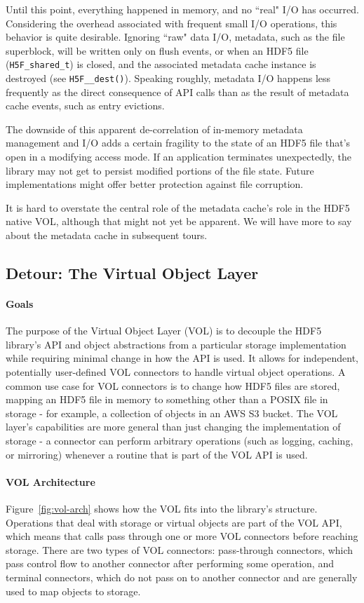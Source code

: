 Until this point, everything happened in memory, and no ``real" I/O has occurred. Considering the overhead associated with frequent small I/O operations, this behavior is quite desirable. Ignoring ``raw" data I/O, metadata, such as the file superblock, will be written only on flush events, or when an HDF5 file (\texttt{H5F\_shared\_t}) is closed, and the associated metadata cache instance is destroyed (see \texttt{H5F\_\_dest()}). Speaking roughly, metadata I/O happens less frequently as the direct consequence of API calls than as the result of metadata cache events, such as entry evictions.

The downside of this apparent de-correlation of in-memory metadata management and I/O adds a certain fragility to the state of an HDF5 file that's open in a modifying access mode. If an application terminates unexpectedly, the library may not get to persist modified portions of the file state. Future implementations might offer better protection against file corruption.

It is hard to overstate the central role of the metadata cache's role in the HDF5 native VOL, although that might not yet be apparent. We will have more to say about the metadata cache in subsequent tours.

\subsection{Detour: The Virtual Object Layer}\label{sec:vol}

\paragraph{Goals} The purpose of the Virtual Object Layer (VOL) is to decouple the HDF5 library's API and object abstractions from a particular storage implementation while requiring minimal change in how the API is used. It allows for independent, potentially user-defined VOL connectors to handle virtual object operations. A common use case for VOL connectors is to change how HDF5 files are stored, mapping an HDF5 file in memory to something other than a POSIX file in storage - for example, a collection of objects in an AWS S3 bucket. The VOL layer's capabilities are more general than just changing the implementation of storage - a connector can perform arbitrary operations (such as logging, caching, or mirroring) whenever a routine that is part of the VOL API is used.

\paragraph{VOL Architecture}  Figure~\ref{fig:vol-arch} shows how the VOL fits into the library's structure. Operations that deal with storage or virtual objects are part of the VOL API, which means that calls pass through one or more VOL connectors before reaching storage. There are two types of VOL connectors: pass-through connectors, which pass control flow to another connector after performing some operation, and terminal connectors, which do not pass on to another connector and are generally used to map objects to storage. 

